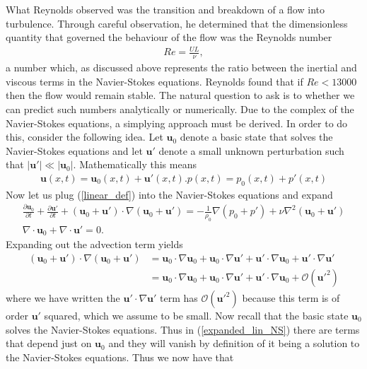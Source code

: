 What Reynolds observed was the transition and breakdown of a flow into turbulence. Through careful observation, he determined that the dimensionless quantity that governed the behaviour of the flow was the Reynolds number 
\begin{align}
Re =\frac{UL}{\nu},
\end{align}
a number which, as discussed above represents the ratio between the inertial and viscous terms in the Navier-Stokes equations. Reynolds found that if $Re<13000$ then the flow would remain stable. The natural question to ask is to whether we can predict such numbers analytically or numerically. Due to the complex of the Navier-Stokes equations, a simplying approach must be derived. In order to do this, consider the following idea. Let $\bm{u}_{0}$ denote a basic state that solves the Navier-Stokes equations and let $\bm{u}'$ denote a small unknown perturbation such that $|\bm{u}'|\ll |\bm{u}_{0}|$. Mathematically this means
\begin{align}
\bm{u}(x,t) = \bm{u}_{0}(x,t) + \bm{u}'(x,t).\label{linear_def}
p(x,t) = p_{0}(x,t) + p'(x,t)
\end{align}
Now let us plug (\ref{linear_def}) into the Navier-Stokes equations and expand
\begin{align}
\frac{\partial \bm{u}_{0}}{\partial t} + \frac{\partial \bm{u}'}{\partial t} + (\bm{u}_{0}+\bm{u}')\cdot\nabla(\bm{u}_{0}+\bm{u}') = -\frac{1}{\rho_{0}}\nabla(p_{0} + p') + \nu\nabla^{2}(\bm{u}_{0} + \bm{u}')\\\label{expanded_lin_NS}
\nabla \cdot \bm{u}_{0} + \nabla \cdot \bm{u}'=0.
\end{align} 
Expanding out the advection term yields
\begin{align}
 (\bm{u}_{0}+\bm{u}')\cdot\nabla(\bm{u}_{0}+\bm{u}') &= \bm{u}_{0}\cdot\nabla\bm{u}_{0} + \bm{u}_{0}\cdot\nabla \bm{u}' + \bm{u}'\cdot\nabla\bm{u}_{0} + \bm{u}'\cdot\nabla\bm{u}'\\
&= \bm{u}_{0}\cdot\nabla\bm{u}_{0} + \bm{u}_{0}\cdot\nabla \bm{u}' + \bm{u}'\cdot\nabla\bm{u}_{0} + \mathcal{O}(\bm{u}'^{2})
\end{align}
where we have written the $\bm{u}'\cdot\nabla\bm{u}'$ term has $\mathcal{O}(\bm{u}'^{2})$ because this term is of order $\bm{u}'$ squared, which we assume to be small. Now recall that the basic state $\bm{u}_{0}$ solves the Navier-Stokes equations. Thus in (\ref{expanded_lin_NS}) there are terms that depend just on $\bm{u}_{0}$ and they will vanish by definition of it being a solution to the Navier-Stokes equations. Thus we now have that
